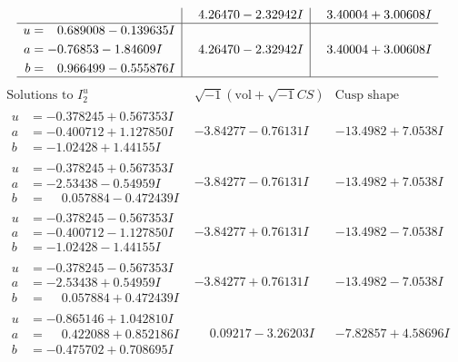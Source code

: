\documentclass[1p]{elsarticle_modified}
\theoremstyle{definition}
\newcommand{\I}{\sqrt{-1}}
\begin{document}
$$\begin{array}{c|c|c}
 & \phantom{-}4.26470 - 2.32942 I & \phantom{-}3.40004 + 3.00608 I \\ \hline\begin{aligned}
u &= \phantom{-}0.689008 - 0.139635 I \\
a &= -0.76853 - 1.84609 I \\
b &= \phantom{-}0.966499 - 0.555876 I\end{aligned}
 & \phantom{-}4.26470 - 2.32942 I & \phantom{-}3.40004 + 3.00608 I\\
 \hline 
 \end{array}$$\newpage$$\begin{array}{c|c|c}  
\text{Solutions to }I^u_{2}& \I (\text{vol} + \sqrt{-1}CS) & \text{Cusp shape}\\
 \hline 
\begin{aligned}
u &= -0.378245 + 0.567353 I \\
a &= -0.400712 + 1.127850 I \\
b &= -1.02428 + 1.44155 I\end{aligned}
 & -3.84277 - 0.76131 I & -13.4982 + 7.0538 I \\ \hline\begin{aligned}
u &= -0.378245 + 0.567353 I \\
a &= -2.53438 - 0.54959 I \\
b &= \phantom{-}0.057884 - 0.472439 I\end{aligned}
 & -3.84277 - 0.76131 I & -13.4982 + 7.0538 I \\ \hline\begin{aligned}
u &= -0.378245 - 0.567353 I \\
a &= -0.400712 - 1.127850 I \\
b &= -1.02428 - 1.44155 I\end{aligned}
 & -3.84277 + 0.76131 I & -13.4982 - 7.0538 I \\ \hline\begin{aligned}
u &= -0.378245 - 0.567353 I \\
a &= -2.53438 + 0.54959 I \\
b &= \phantom{-}0.057884 + 0.472439 I\end{aligned}
 & -3.84277 + 0.76131 I & -13.4982 - 7.0538 I \\ \hline\begin{aligned}
u &= -0.865146 + 1.042810 I \\
a &= \phantom{-}0.422088 + 0.852186 I \\
b &= -0.475702 + 0.708695 I\end{aligned}
 & \phantom{-}0.09217 - 3.26203 I & -7.82857 + 4.58696 I \\ \hline\begin{aligned}

\end{aligned}
\end{array}$$
\end{document}
